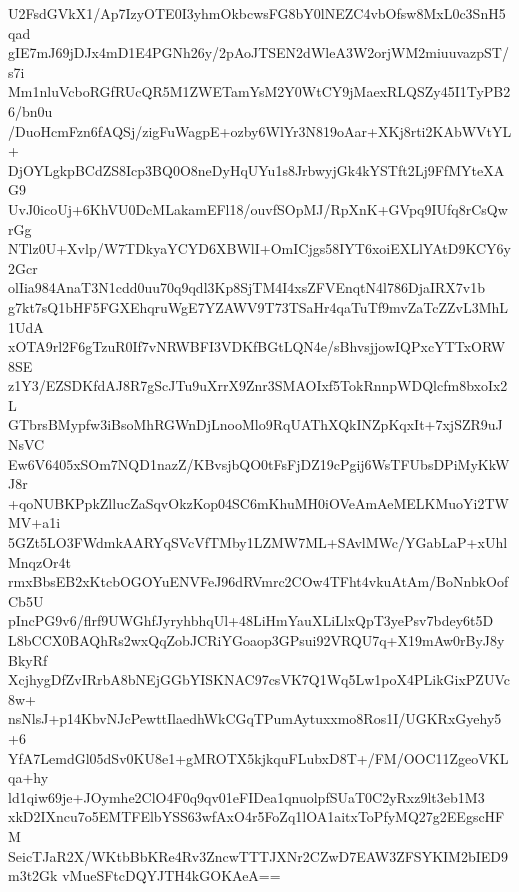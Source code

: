 U2FsdGVkX1/Ap7IzyOTE0I3yhmOkbcwsFG8bY0lNEZC4vbOfsw8MxL0c3SnH5qad
gIE7mJ69jDJx4mD1E4PGNh26y/2pAoJTSEN2dWleA3W2orjWM2miuuvazpST/s7i
Mm1nluVcboRGfRUcQR5M1ZWETamYsM2Y0WtCY9jMaexRLQSZy45I1TyPB26/bn0u
/DuoHcmFzn6fAQSj/zigFuWagpE+ozby6WlYr3N819oAar+XKj8rti2KAbWVtYL+
DjOYLgkpBCdZS8Icp3BQ0O8neDyHqUYu1s8JrbwyjGk4kYSTft2Lj9FfMYteXAG9
UvJ0icoUj+6KhVU0DcMLakamEFl18/ouvfSOpMJ/RpXnK+GVpq9IUfq8rCsQwrGg
NTlz0U+Xvlp/W7TDkyaYCYD6XBWlI+OmICjgs58IYT6xoiEXLlYAtD9KCY6y2Gcr
olIia984AnaT3N1cdd0uu70q9qdl3Kp8SjTM4I4xsZFVEnqtN4l786DjaIRX7v1b
g7kt7sQ1bHF5FGXEhqruWgE7YZAWV9T73TSaHr4qaTuTf9mvZaTcZZvL3MhL1UdA
xOTA9rl2F6gTzuR0If7vNRWBFI3VDKfBGtLQN4e/sBhvsjjowIQPxcYTTxORW8SE
z1Y3/EZSDKfdAJ8R7gScJTu9uXrrX9Znr3SMAOIxf5TokRnnpWDQlcfm8bxoIx2L
GTbrsBMypfw3iBsoMhRGWnDjLnooMlo9RqUAThXQkINZpKqxIt+7xjSZR9uJNsVC
Ew6V6405xSOm7NQD1nazZ/KBvsjbQO0tFsFjDZ19cPgij6WsTFUbsDPiMyKkWJ8r
+qoNUBKPpkZllucZaSqvOkzKop04SC6mKhuMH0iOVeAmAeMELKMuoYi2TWMV+a1i
5GZt5LO3FWdmkAARYqSVcVfTMby1LZMW7ML+SAvlMWc/YGabLaP+xUhlMnqzOr4t
rmxBbsEB2xKtcbOGOYuENVFeJ96dRVmrc2COw4TFht4vkuAtAm/BoNnbkOofCb5U
pIncPG9v6/flrf9UWGhfJyryhbhqUl+48LiHmYauXLiLlxQpT3yePsv7bdey6t5D
L8bCCX0BAQhRs2wxQqZobJCRiYGoaop3GPsui92VRQU7q+X19mAw0rByJ8yBkyRf
XcjhygDfZvIRrbA8bNEjGGbYISKNAC97csVK7Q1Wq5Lw1poX4PLikGixPZUVc8w+
nsNlsJ+p14KbvNJcPewttIlaedhWkCGqTPumAytuxxmo8Ros1I/UGKRxGyehy5+6
YfA7LemdGl05dSv0KU8e1+gMROTX5kjkquFLubxD8T+/FM/OOC11ZgeoVKLqa+hy
ld1qiw69je+JOymhe2ClO4F0q9qv01eFIDea1qnuolpfSUaT0C2yRxz9lt3eb1M3
xkD2IXncu7o5EMTFElbYSS63wfAxO4r5FoZq1lOA1aitxToPfyMQ27g2EEgscHFM
SeicTJaR2X/WKtbBbKRe4Rv3ZncwTTTJXNr2CZwD7EAW3ZFSYKIM2bIED9m3t2Gk
vMueSFtcDQYJTH4kGOKAeA==
